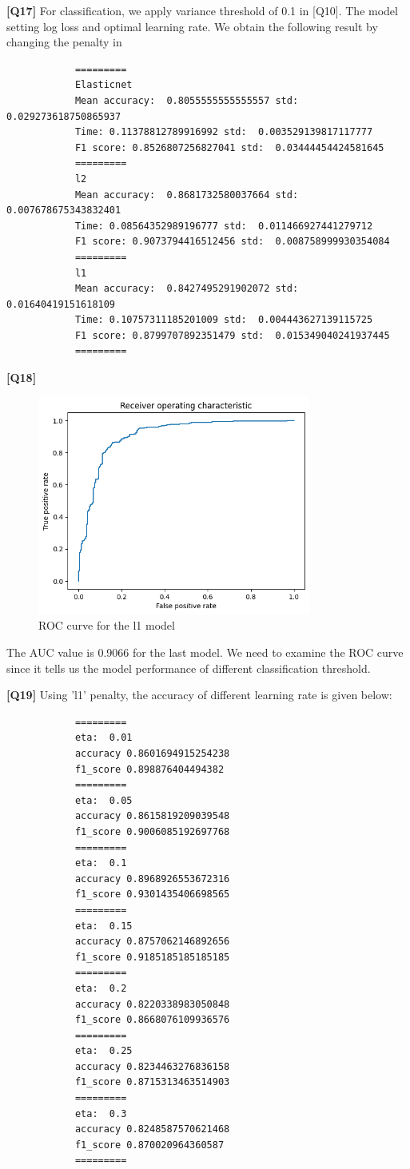 \documentclass{article}
\begin{document}
\begin{description}
	\item \textbf{[Q17]} For classification, we apply variance threshold of 0.1 in [Q10]. The model setting log loss and optimal learning rate. We obtain the following result by changing the penalty in 
		\begin{verbatim}
			=========
			Elasticnet
			Mean accuracy:  0.8055555555555557 std:  0.029273618750865937
			Time: 0.11378812789916992 std:  0.003529139817117777
			F1 score: 0.8526807256827041 std:  0.03444454424581645
			=========
			l2
			Mean accuracy:  0.8681732580037664 std:  0.007678675343832401
			Time: 0.08564352989196777 std:  0.011466927441279712
			F1 score: 0.9073794416512456 std:  0.008758999930354084
			=========
			l1
			Mean accuracy:  0.8427495291902072 std:  0.01640419151618109
			Time: 0.10757311185201009 std:  0.004443627139115725
			F1 score: 0.8799707892351479 std:  0.015349040241937445
			=========
		\end{verbatim}
	\item \textbf{[Q18]}
		\begin{figure}[H]
			\centering
			\includegraphics[width=0.8\textwidth]{figures/q18_roc_curve.png}
			\caption{ROC curve for the l1 model}
			\label{roc_curve}
		\end{figure}
		The AUC value is 0.9066 for the last model. We need to examine the ROC curve since it tells us the model performance of different classification threshold.
	\item \textbf{[Q19]} Using 'l1' penalty, the accuracy of different learning rate is given below:
		\begin{verbatim}
			=========
			eta:  0.01
			accuracy 0.8601694915254238
			f1_score 0.898876404494382
			=========
			eta:  0.05
			accuracy 0.8615819209039548
			f1_score 0.9006085192697768
			=========
			eta:  0.1
			accuracy 0.8968926553672316
			f1_score 0.9301435406698565
			=========
			eta:  0.15
			accuracy 0.8757062146892656
			f1_score 0.9185185185185185
			=========
			eta:  0.2
			accuracy 0.8220338983050848
			f1_score 0.8668076109936576
			=========
			eta:  0.25
			accuracy 0.8234463276836158
			f1_score 0.8715313463514903
			=========
			eta:  0.3
			accuracy 0.8248587570621468
			f1_score 0.870020964360587
			=========
		\end{verbatim}

\end{description}
\end{document}
